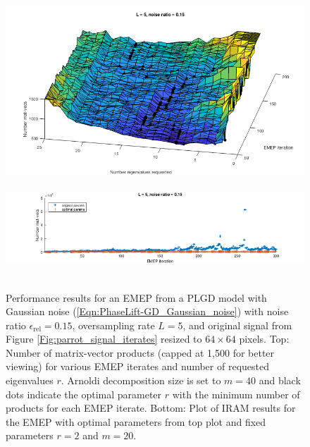 \begin{figure}[H]
\centering
\hbox{\hspace{-0.8cm} \includegraphics[scale=0.6]{Numerics-num_matvecs_orig_vs_optimal_params_1} }\vspace{1.0cm}
\hbox{\hspace{-1.6cm} \includegraphics[scale=0.6]{Numerics-num_matvecs_orig_vs_optimal_params_2} }\vspace{0.0cm}
	\caption{
Performance results for an EMEP from a PLGD model with Gaussian noise	(\ref{Eqn:PhaseLift-GD_Gaussian_noise}) with noise ratio $\epsilon_\text{rel} = 0.15$, oversampling rate $L = 5$, and original signal from Figure \ref{Fig:parrot_signal_iterates} resized to $64 \times 64$ pixels.
Top: Number of matrix-vector products (capped at 1,500 for better viewing) for various EMEP iterates and number of requested eigenvalues $r$.  
Arnoldi decomposition size is set to $m = 40$ and black dots indicate the optimal parameter $r$ with the minimum number of products for each EMEP iterate.
Bottom: Plot of IRAM results for the EMEP with optimal parameters from top plot and fixed parameters $r=2$ and $m=20$.
	}
\label{Fig:Numerics-num_matvecs_orig_vs_optimal_params}
\end{figure}




